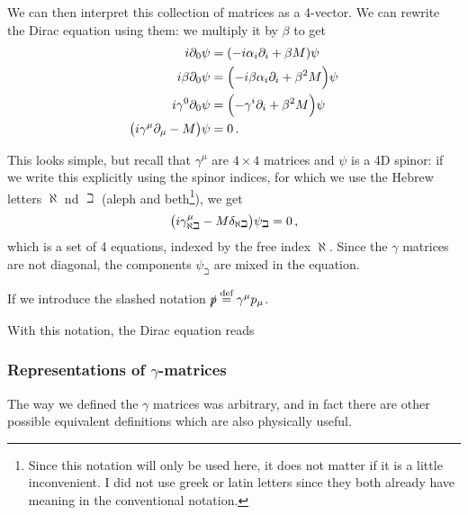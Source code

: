 \documentclass[main.tex]{subfiles}
\begin{document}
We can then interpret this collection of matrices as a 4-vector. 
We can rewrite the Dirac equation using them: we multiply it by \(\beta \) to get 
%
\begin{align}
i \partial_0 \psi &= \qty(-i \alpha_{i} \partial_{i}+ \beta M ) \psi  \\
i \beta \partial_0 \psi &= \qty(-i \beta \alpha_{i} \partial_{i} + \beta^2 M) \psi  \\
i \gamma^{0} \partial_0 \psi &= \qty(- \gamma^{i}\partial_{i} + \beta^2 M) \psi  \\
\qty(i \gamma^{\mu } \partial_{\mu } - M ) \psi &= 0 
\,.
\end{align}

This looks simple, but recall that \(\gamma^{\mu }\) are \(4 \times 4\) matrices and \(\psi \) is a 4D spinor: if we write this explicitly using the spinor indices, for which we use the Hebrew letters \(\aleph\) nd \(\beth\) (aleph and beth\footnote{Since this notation will only be used here, it does not matter if it is a little inconvenient. I did not use greek or latin letters since they both already have meaning in the conventional notation.}), we get 
%
\begin{align}
\qty(i \gamma^{\mu }_{\aleph \beth} - M \delta_{\aleph \beth}) \psi_{\beth} = 0 
\,,
\end{align}
%
which is a set of 4 equations, indexed by the free index \(\aleph\).
Since the \(\gamma \) matrices are not diagonal, the components \(\psi_{\beth}\) are mixed in the equation. 

If we introduce the slashed notation \(\slashed{p} \overset{\text{def}}{=} \gamma^{\mu }p_{\mu }\). 

With this notation, the Dirac equation reads 
%

\subsubsection{Representations of \(\gamma \)-matrices}

The way we defined the \(\gamma \) matrices was arbitrary, and in fact there are other possible equivalent definitions which are also physically useful. 
\end{document}
